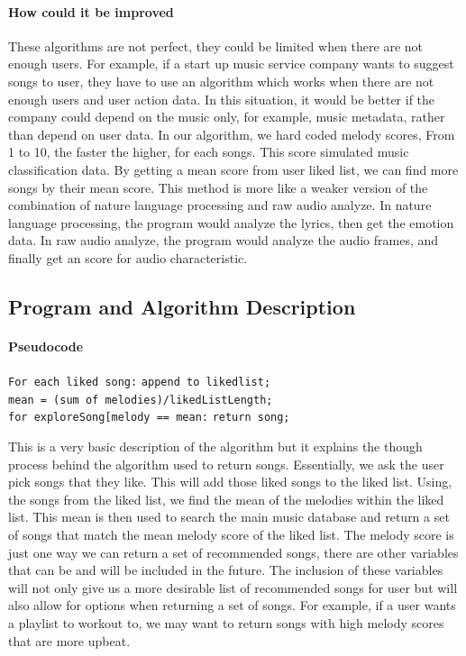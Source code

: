 \documentclass[]{article}
\let\oldparagraph\paragraph
\renewcommand{\paragraph}[1]{\oldparagraph{#1}\mbox{}}
\begin{document}
\paragraph{How could it be improved}\label{how-could-it-be-improved}

These algorithms are not perfect, they could be limited when there are
not enough users. For example, if a start up music service company wants
to suggest songs to user, they have to use an algorithm which works when
there are not enough users and user action data. In this situation, it
would be better if the company could depend on the music only, for
example, music metadata, rather than depend on user data. In our
algorithm, we hard coded melody scores, From 1 to 10, the faster the
higher, for each songs. This score simulated music classification data.
By getting a mean score from user liked list, we can find more songs by
their mean score. This method is more like a weaker version of the
combination of nature language processing and raw audio analyze. In
nature language processing, the program would analyze the lyrics, then
get the emotion data. In raw audio analyze, the program would analyze
the audio frames, and finally get an score for audio characteristic.

\subsection{Program and Algorithm
Description}\label{program-and-algorithm-description}

\paragraph{Pseudocode}\label{pseudocode}

\texttt{For\ each\ liked\ song:} \texttt{append\ to\ likedlist;}
\texttt{mean\ =\ (sum\ of\ melodies)/likedListLength;}
\texttt{for\ exploreSong{[}\textquotesingle{}melody\textquotesingle{}{]}\ ==\ mean:}
\texttt{return\ song;}

This is a very basic description of the algorithm but it explains the
though process behind the algorithm used to return songs. Essentially,
we ask the user pick songs that they like. This will add those liked
songs to the liked list. Using, the songs from the liked list, we find
the mean of the melodies within the liked list. This mean is then used
to search the main music database and return a set of songs that match
the mean melody score of the liked list. The melody score is just one
way we can return a set of recommended songs, there are other variables
that can be and will be included in the future. The inclusion of these
variables will not only give us a more desirable list of recommended
songs for user but will also allow for options when returning a set of
songs. For example, if a user wants a playlist to workout to, we may
want to return songs with high melody scores that are more upbeat.
\end{document}
